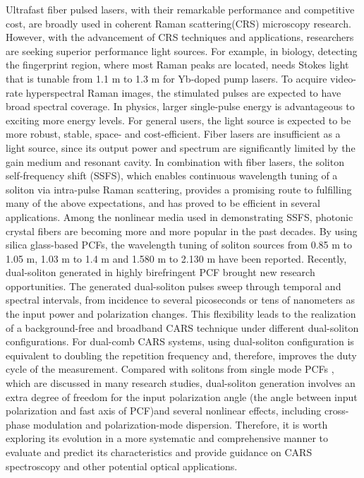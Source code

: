 \documentclass{osa-article}
\begin{document}
Ultrafast fiber pulsed lasers, with their remarkable performance and competitive cost, are broadly used in coherent Raman scattering(CRS) microscopy research\cite{andresen_tunable_2006, andresen_stimulated_2011, Gottschall.2015, Krafft.2016}. However, with the advancement of CRS techniques and applications, researchers are seeking superior performance light sources. For example, in biology, detecting the fingerprint region, where most Raman peaks are located, needs Stokes light that is tunable from 1.1 \textmu m to 1.3 \textmu m for Yb-doped pump lasers\cite{Gottschall.2015}. To acquire video-rate hyperspectral Raman images, the stimulated pulses are expected to have broad spectral coverage. In physics, larger single-pulse energy is advantageous to exciting more energy levels. For general users, the light source is expected to be more robust, stable, space- and cost-efficient. Fiber lasers are insufficient as a light source, since its output power and spectrum are significantly limited by the gain medium and resonant cavity. In combination with fiber lasers, the soliton self-frequency shift (SSFS), which enables continuous wavelength tuning of a soliton via intra-pulse Raman scattering, provides a promising route to fulfilling many of the above expectations, and has proved to be efficient in several applications\cite{Paulsen2003,yuan_red-shifted_2015,Li.2017}. Among the nonlinear media used in demonstrating SSFS, photonic crystal fibers are becoming more and more popular in the past decades. By using silica glass-based PCFs, the wavelength tuning of soliton sources from 0.85 \textmu m to 1.05 \textmu m\cite{Su2013}, 1.03 \textmu m to 1.4 \textmu m\cite{Andresen.2007} and 1.580 \textmu m to 2.130 \textmu m\cite{wang.2011} have been reported. Recently, dual-soliton generated in highly birefringent PCF brought new research opportunities. The generated dual-soliton pulses sweep through temporal and spectral intervals, from incidence to several picoseconds or tens of nanometers as the input power and polarization changes. This flexibility leads to the realization of a background-free\cite{chen_dual-soliton_2016} and broadband\cite{chen_cascaded_2016} CARS technique under different dual-soliton configurations. For dual-comb CARS systems\cite{ideguchi_coherent_2013, mohler_dual-comb_2017}, using dual-soliton configuration is equivalent to doubling the repetition frequency and, therefore, improves the duty cycle of the measurement. Compared with solitons from single mode PCFs \cite{klarskov_supercontinuum_2011,arteaga-sierra_supercontinuum_2014,Qiu.2014}, which are discussed in many research studies, dual-soliton generation involves an extra degree of freedom for the input polarization angle (the angle between input polarization and fast axis of PCF)and several nonlinear effects, including cross-phase modulation and polarization-mode dispersion. Therefore, it is worth exploring its evolution in a more systematic and comprehensive manner to evaluate and predict its characteristics and provide guidance on CARS spectroscopy and other potential optical applications. 
\end{document}

